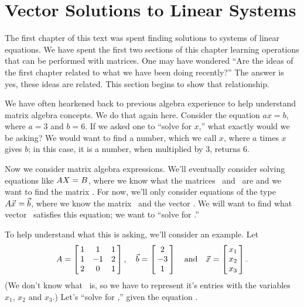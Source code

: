\section{Vector Solutions to Linear Systems}\label{sec:vector_solutions}


The first chapter of this text was spent finding solutions to systems of linear equations. We have spent the first two sections of this chapter learning operations that can be performed with matrices. One may have wondered ``Are the ideas of the first chapter related to what we have been doing recently?'' The answer is yes, these ideas are related. This section begins to show that relationship.

We have often hearkened back to previous algebra experience to help understand matrix algebra concepts. We do that again here. Consider the equation $ax=b$, where $a=3$ and $b=6$. If we asked one to ``solve for $x$,'' what exactly would we be asking? We would want to find a number, which we call $x$, where $a$ times $x$ gives $b$; in this case, it is a number, when multiplied by 3, returns 6. 

Now we consider matrix algebra expressions. We'll eventually consider solving equations like $\tta\ttx = \ttb$, where we know what the matrices \tta\ and \ttb\ are and we want to find the matrix \ttx. For now, we'll only consider equations of the type $\tta\vx=\vb$, where we know the matrix \tta\ and the vector \vb. We will want to find what vector \vx\ satisfies this equation; we want to ``solve for \vx.'' 

To help understand what this is asking, we'll consider an example. Let $$\tta = \bmx{ccc}1&1&1\\1&-1&2\\2&0&1\emx, \quad \vb = \bmx{c}2\\-3\\1\emx \quad \text{and} \quad \vx=\bmx{c}x_1\\x_2\\x_3\emx.$$ (We don't know what \vx\ is, so we have to represent it's entries with the variables $x_1$, $x_2$ and $x_3$.) Let's ``solve for \vx,'' given the equation \ttaxb.


